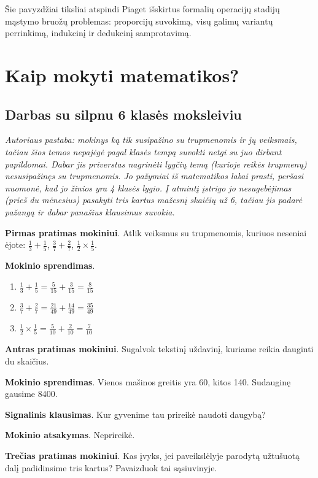 \documentclass{article}
\begin{document}
Šie pavyzdžiai tiksliai atspindi Piaget išskirtus formalių operacijų stadijų mąstymo bruožų problemas: proporcijų suvokimą, visų galimų variantų perrinkimą, indukcinį ir dedukcinį samprotavimą.

\section{Kaip mokyti matematikos?}\hypertarget{kaipmokyt}{}
\subsection{Darbas su silpnu 6 klasės moksleiviu}
\textit{Autoriaus pastaba: mokinys ką tik susipažino su trupmenomis ir jų veiksmais, tačiau šios temos nepajėgė pagal klasės tempą suvokti netgi su juo dirbant papildomai. Dabar jis priverstas nagrinėti lygčių temą (kurioje reikės trupmenų) nesusipažinęs su trupmenomis. Jo pažymiai iš matematikos labai prasti, peršasi nuomonė, kad jo žinios yra 4 klasės lygio. Į atmintį įstrigo jo nesugebėjimas (prieš du mėnesius) pasakyti tris kartus mažesnį skaičių už 6, tačiau jis padarė pažangą ir dabar panašius klausimus suvokia.}

\textbf{Pirmas pratimas mokiniui}. Atlik veiksmus su trupmenomis, kuriuos neseniai ėjote: $\frac{1}{3}+\frac{1}{5}$, $\frac{3}{7}+\frac{2}{7}$, $\frac{1}{2}\times \frac{1}{5}$.

\textbf{Mokinio sprendimas}.

\begin{enumerate}
\item $\frac{1}{3}+\frac{1}{5}=\frac{5}{15}+\frac{3}{15}=\frac{8}{15}$
\item $\frac{3}{7}+\frac{2}{7}=\frac{21}{49}+\frac{14}{49}=\frac{35}{49}$
\item $\frac{1}{2}\times \frac{1}{5}=\frac{5}{10}+ \frac{2}{10}=\frac{7}{10}$
\end{enumerate}

\textbf{Antras pratimas mokiniui}. Sugalvok tekstinį uždavinį, kuriame reikia dauginti du skaičius.

\textbf{Mokinio sprendimas}. Vienos mašinos greitis yra 60, kitos 140. Sudauginę gausime 8400.

\textbf{Signalinis klausimas}. Kur gyvenime tau prireikė naudoti daugybą?

\textbf{Mokinio atsakymas}. Neprireikė.

\textbf{Trečias pratimas mokiniui}. Kas įvyks, jei paveikslėlyje parodytą užtušuotą dalį padidinsime tris kartus? Pavaizduok tai sąsiuvinyje.
\end{document}
